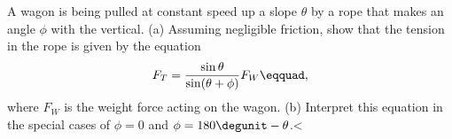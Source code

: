 A wagon is being pulled at constant speed up a slope
$\theta $ by a rope that makes an angle $\phi $ with the
vertical.\hwendpart
 (a) Assuming negligible friction, show that the
tension in the rope is given by the equation
\begin{equation*}
  F_T = \frac{\sin\theta}{\sin(\theta+\phi)}F_W\eqquad,
\end{equation*}
where $F_W$ is the weight force acting on the wagon.\hwendpart
 (b)
Interpret this equation in the special cases of $\phi=0$
and $\phi =180\degunit-\theta$.<%
